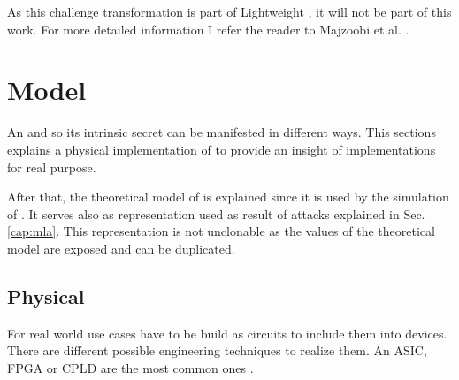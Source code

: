 As this challenge transformation is part of Lightweight \pufs, it will not be part of this work.
For more detailed information I refer the reader to Majzoobi et al. \cite{Majzoobi2008LightweightPUFs} .


\section{Model}

An \apuf and so its intrinsic secret can be manifested in different ways.
This sections explains a physical implementation of \apufs to provide an insight of \apuf implementations for real purpose. %

After that, the theoretical model of \apufs is explained since it is used by the simulation of \apufs.
It serves also as representation used as result of attacks explained in Sec. \ref{cap:mla}.
This representation is not unclonable as the values of the theoretical model are exposed and can be duplicated.


\subsection{Physical}
\label{sec:physical}

For real world use cases \apufs have to be build as circuits to include them into devices.
There are different possible engineering techniques to realize them.
An \ac{ASIC}, \ac{FPGA} or \ac{CPLD} are the most common ones \cite{Maes2012ExperimentalCMOS, Majzoobi2010FPGALines, Soybali2011ImplementationFPGA, Tajik2014PhysicalPUFs}.

